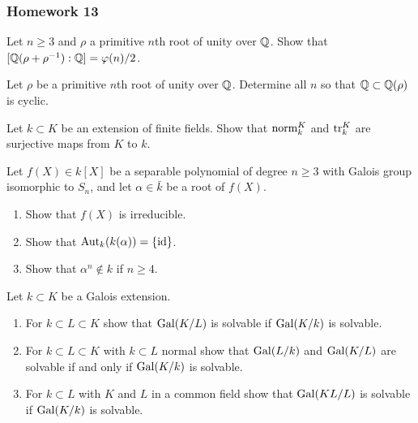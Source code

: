 \subsubsection{Homework 13}
\setcounter{exercise}{0}
\setcounter{equation}{0}

\begin{problem}
Let $n\geq 3$ and $\rho$ a primitive $n$th root of unity over $\mathbb{Q}$. Show
that $[\mathbb{Q}(\rho+\rho^{-1}):\mathbb{Q}]=\varphi(n)/2$.
\end{problem}
\begin{solution}
\end{solution}

\begin{problem}
Let $\rho$ be a primitive $n$th root of unity over $\mathbb{Q}$. Determine all
$n$ so that $\mathbb{Q}\subset\mathbb{Q}(\rho)$ is cyclic.
\end{problem}
\begin{solution}
\end{solution}

\begin{problem}
  Let $k\subset K$ be an extension of finite fields. Show that
  $\operatorname{norm}_k^K$ and $\operatorname{tr}_k^K$ are surjective maps from $K$ to
  $k$.
\end{problem}
\begin{solution}
\end{solution}

\begin{problem}
  Let $f(X)\in k[X]$ be a separable polynomial of degree $n\geq 3$ with
  Galois group isomorphic to $S_n$, and let $\alpha\in\bar k$ be a root
  of $f(X)$.
  \begin{enumerate}[label=(\alph*),noitemsep]
  \item Show that $f(X)$ is irreducible.
  \item Show that $\operatorname{Aut}_k(k(\alpha))=\{\operatorname{id}\}$.
  \item Show that $\alpha^n\notin k$ if $n\geq 4$.
  \end{enumerate}
\end{problem}
\begin{solution}
\end{solution}

\begin{problem}
  Let $k\subset K$ be a Galois extension.
\begin{enumerate}[label=(\alph*),noitemsep]
\item For $k\subset L\subset K$ show that $\operatorname{Gal}(K/L)$ is
  solvable if $\operatorname{Gal}(K/k)$ is solvable.
\item For $k\subset L\subset K$ with $k\subset L$ normal show
  that $\operatorname{Gal}(L/k)$ and $\operatorname{Gal}(K/L)$ are solvable if and only if
  $\operatorname{Gal}(K/k)$ is solvable.
\item For $k\subset L$ with $K$ and $L$ in a common field show
  that $\operatorname{Gal}(KL/L)$ is solvable if $\operatorname{Gal}(K/k)$ is solvable.
\end{enumerate}
\end{problem}
\begin{solution}
\end{solution}

